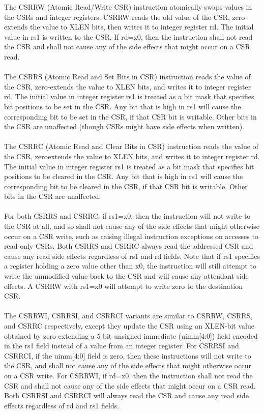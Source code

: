 \documentclass[../main.tex]{subfiles}
\begin{document}
\noindent The CSRRW (Atomic Read/Write CSR) instruction atomically swaps values in the CSRs and integer registers. CSRRW reads the old value of the CSR, zero-extends the value to XLEN bits, then writes it to integer register rd. The initial value in rs1 is written to the CSR. If rd=x0, then the instruction shall not read the CSR and shall not cause any of the side effects that might occur on a CSR read.\\
\\The CSRRS (Atomic Read and Set Bits in CSR) instruction reads the value of the CSR, zero-extends the value to XLEN bits, and writes it to integer register rd. The initial value in integer register rs1 is treated as a bit mask that specifies bit positions to be set in the CSR. Any bit that is high in rs1 will cause the corresponding bit to be set in the CSR, if that CSR bit is writable. Other bits in the CSR are unaffected (though CSRs might have side effects when written).\\
\\The CSRRC (Atomic Read and Clear Bits in CSR) instruction reads the value of the CSR, zeroextends the value to XLEN bits, and writes it to integer register rd. The initial value in integer register rs1 is treated as a bit mask that specifies bit positions to be cleared in the CSR. Any bit that is high in rs1 will cause the corresponding bit to be cleared in the CSR, if that CSR bit is writable. Other bits in the CSR are unaffected.\\
\\For both CSRRS and CSRRC, if rs1=x0, then the instruction will not write to the CSR at all, and so shall not cause any of the side effects that might otherwise occur on a CSR write, such as raising
illegal instruction exceptions on accesses to read-only CSRs. Both CSRRS and CSRRC always read the addressed CSR and cause any read side effects regardless of rs1 and rd fields. Note that if rs1
specifies a register holding a zero value other than x0, the instruction will still attempt to write the unmodified value back to the CSR and will cause any attendant side effects. A CSRRW with
rs1=x0 will attempt to write zero to the destination CSR.\\
\\The CSRRWI, CSRRSI, and CSRRCI variants are similar to CSRRW, CSRRS, and CSRRC respectively, except they update the CSR using an XLEN-bit value obtained by zero-extending a 5-bit unsigned immediate (uimm[4:0]) field encoded in the rs1 field instead of a value from an integer register. For CSRRSI and CSRRCI, if the uimm[4:0] field is zero, then these instructions will not write to the CSR, and shall not cause any of the side effects that might otherwise occur on a CSR write. For CSRRWI, if rd=x0, then the instruction shall not read the CSR and shall not cause any of the side effects that might occur on a CSR read. Both CSRRSI and CSRRCI will always read the CSR and cause any read side effects regardless of rd and rs1 fields.
\end{document}
